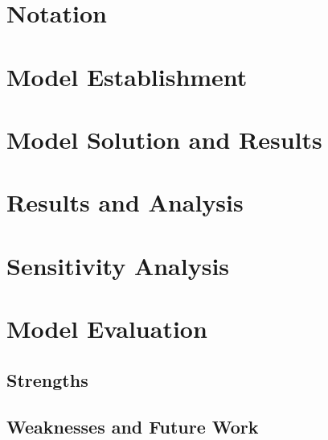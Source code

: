 \documentclass[12pt]{article}
\begin{document}
\section{Notation}

\section{Model Establishment}

\section{Model Solution and Results}

\section{Results and Analysis}

\section{Sensitivity Analysis}

\section{Model Evaluation}

\subsection{Strengths}

\subsection{Weaknesses and Future Work}
\end{document}
